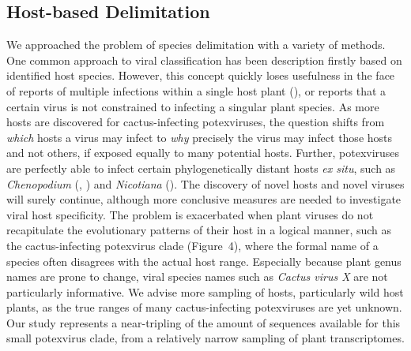 \documentclass[fleqn,10pt,lineno]{wlpeerj}
\begin{document}
{\subsection*{Host-based Delimitation}
We approached the problem of species delimitation with a variety of methods. 
One common  approach to viral classification has been description firstly based on identified host species. 
However, this concept quickly loses usefulness in the face of reports of multiple infections within a single host plant (\citealt{li_viral_2015}), or reports that a certain virus is not constrained to infecting a singular plant species.
As more hosts are discovered for cactus-infecting potexviruses, the question shifts from \textit{which} hosts a virus may infect to \textit{why} precisely the virus may infect those hosts and not others, if exposed equally to many potential hosts.
Further, potexviruses are perfectly able to infect certain phylogenetically distant hosts \textit{ex situ}, such as \textit{Chenopodium} (\citealt{plese_vergleichende_1966}, \citealt{attathom_occurrence_1978}) and \textit{Nicotiana} (\citealt{casper_new_1969}).
The discovery of novel hosts and novel viruses will surely continue, although more conclusive measures are needed to investigate viral host specificity.
The problem is exacerbated when plant viruses do not recapitulate the evolutionary patterns of their host in a logical manner, such as the cactus-infecting potexvirus clade ({Figure~4}), where the formal name of a species often disagrees with the actual host range. 
Especially because plant genus names are prone to change, viral species names such as \textit{Cactus virus X} are not particularly informative.
We advise more sampling of hosts, particularly wild host plants, as the true ranges of many cactus-infecting potexviruses are yet unknown. 
Our study represents a near-tripling of the amount of sequences available for this small potexvirus clade, from a relatively narrow sampling of plant transcriptomes.

}
\end{document}
